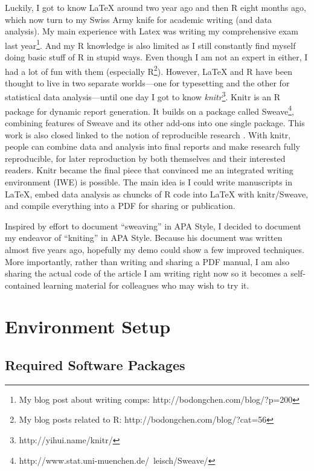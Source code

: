 \documentclass[man]{apa6}\usepackage{knitr}
\begin{document}
Luckily, I got to know LaTeX around two year ago and then R eight months ago, which now turn to my Swiss Army knife for academic writing (and data analysis). 
My main experience with Latex was writing my comprehensive exam last year\footnote{My blog post about writing comps: http://bodongchen.com/blog/?p=200}. 
And my R knowledge is also limited as I still constantly find myself doing basic stuff of R in stupid ways. 
Even though I am not an expert in either, I had a lot of fun with them (especially R\footnote{My blog posts related to R: http://bodongchen.com/blog/?cat=56}). 
However, LaTeX and R have been thought to live in two separate worlds---one for typesetting and the other for statistical data analysis---until one day I got to know \emph{knitr}\footnote{http://yihui.name/knitr/}. 
Knitr is an R package for dynamic report generation. 
It builds on a package called Sweave\footnote{http://www.stat.uni-muenchen.de/~leisch/Sweave/}, combining features of Sweave and its other add-ons into one single package. 
This work is also closed linked to the notion of reproducible research \parencite{Peng2006}. 
With knitr, people can combine data and analysis into final reports and make research fully reproducible, for later reproduction by both themselves and their interested readers. 
Knitr became the final piece that convinced me an integrated writing environment (IWE) is possible. 
The main idea is I could write manuscripts in LaTeX, embed data analysis as chuncks of R code into LaTeX with knitr/Sweave, and compile everything into a PDF for sharing or publication. 

Inspired by  effort to document ``sweaving'' in APA Style, I decided to document my endeavor of ``kniting'' in APA Style. 
Because his document was written almost five years ago, hopefully my demo could show a few improved techniques. 
More importantly, rather than writing and sharing a PDF manual, I am also sharing the actual code of the article I am writing right now so it becomes a self-contained learning material for colleagues who may wish to try it. 


\section{Environment Setup}

\subsection{Required Software Packages}
\end{document}
